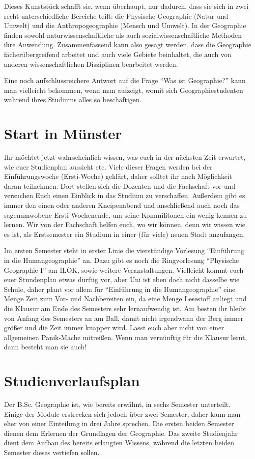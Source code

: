 Dieses Kunststück schafft sie, wenn überhaupt, nur dadurch, dass sie sich in zwei recht unterschiedliche Bereiche teilt: die Physische Geographie (Natur und Umwelt) und die Anthropogeographie (Mensch und Umwelt). In der Geographie ﬁnden sowohl naturwissenschaftliche als auch sozialwissenschaftliche Methoden ihre Anwendung. Zusammenfassend kann also gesagt werden, dass die Geographie fächerübergreifend arbeitet und auch viele Gebiete beinhaltet, die auch von anderen wissenschaftlichen Disziplinen bearbeitet werden.

Eine noch aufschlussreichere Antwort auf die Frage \enquote{Was ist Geographie?} kann man vielleicht bekommen, wenn man aufzeigt, womit sich Geographiestudenten während ihres Studiums alles so beschäftigen.

\section*{Start in Münster}
Ihr möchtet jetzt wahrscheinlich wissen, was euch in der nächsten Zeit erwartet, wie euer Studienplan aussieht etc. Viele dieser Fragen werden bei der Einführungswoche (Ersti-Woche) geklärt, daher solltet ihr nach Möglichkeit daran teilnehmen. Dort stellen sich die Dozenten und die Fachschaft vor und versuchen Euch einen Einblick in das Studium zu verschaffen. Außerdem gibt es immer den einen oder anderen Kneipenabend und anschließend auch noch das sagenumwobene Ersti-Wochenende, um seine Kommilitonen ein wenig kennen zu lernen. Wir von der Fachschaft helfen euch, wo wir können, denn wir wissen wie es ist, als Erstsemester ein Studium in einer (für viele) neuen Stadt anzufangen.

Im ersten Semester steht in erster Linie die vierstündige Vorlesung \enquote{Einführung in die Humangeographie} an. Dazu gibt es noch die Ringvorlesung \enquote{Physische Geographie I} am ILÖK, sowie weitere Veranstaltungen. Vielleicht kommt euch euer Stundenplan etwas dürftig vor, aber Uni ist eben doch nicht dasselbe wie Schule, daher plant vor allem für \enquote{Einführung in die Humangeographie} eine Menge Zeit zum Vor- und Nachbereiten ein, da eine Menge Lesestoff anliegt und die Klausur am Ende des Semesters sehr lernaufwendig ist. Am besten ihr bleibt von Anfang des Semesters an am Ball, damit nicht irgendwann der Berg immer größer und die Zeit immer knapper wird. Lasst euch aber nicht von einer allgemeinen Panik-Mache mitreißen. Wenn man vernünftig für die Klausur lernt, dann besteht man sie auch!

\section{Studienverlaufsplan}
Der B.Sc. Geographie ist, wie bereits erwähnt, in sechs Semester unterteilt. Einige der Module erstrecken sich jedoch über zwei Semester, daher kann man eher von einer Einteilung in drei Jahre sprechen. Die ersten beiden Semester dienen dem Erlernen der Grundlagen der Geographie. Das zweite Studienjahr dient dem Aufbau des bereits erlangten Wissens, während die letzten beiden Semester dieses vertiefen sollen.

